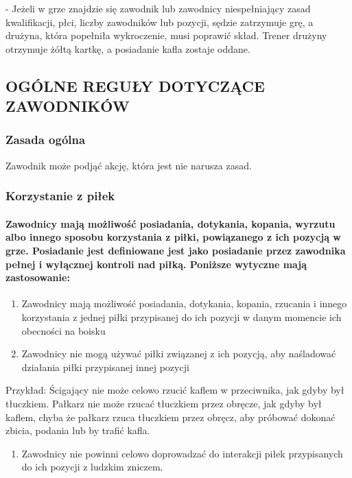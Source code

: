 \documentclass[12pt]{article}
\newcommand\other{\bgroup\color{green}\markoverwith{\textcolor{green}{\rule[-0.5ex]{2pt}{0.4pt}}}\ULon}
\begin{document}
\other{Kara specjalna} - Jeżeli w grze znajdzie się zawodnik lub
zawodnicy niespełniający zasad kwalifikacji, płci, liczby zawodników lub
pozycji, sędzie zatrzymuje grę, a drużyna, która popełniła wykroczenie,
musi poprawić skład. Trener drużyny otrzymuje żółtą kartkę, a posiadanie
kafla zostaje oddane.

\subsection{OGÓLNE REGUŁY DOTYCZĄCE ZAWODNIKÓW}

\subsubsection{Zasada ogólna}

Zawodnik może podjąć akcję, która jest nie narusza zasad.

\subsubsection{Korzystanie z piłek}

\paragraph{Zawodnicy mają możliwość posiadania, dotykania,
	kopania, wyrzutu albo innego sposobu korzystania z piłki, powiązanego z
	ich pozycją w grze. Posiadanie jest definiowane jest jako posiadanie
	przez zawodnika pełnej i wyłącznej kontroli nad piłką. Poniższe wytyczne
	mają zastosowanie:}

\begin{enumerate}
	\item
	      Zawodnicy mają możliwość posiadania, dotykania, kopania, rzucania i
	      innego korzystania z jednej piłki przypisanej do ich pozycji w danym
	      momencie ich obecności na boisku
	\item
	      Zawodnicy nie mogą używać piłki związanej z ich pozycją, aby
	      naśladować działania piłki przypisanej innej pozycji
\end{enumerate}

Przykład: Ścigający nie może celowo rzucić kaflem w
przeciwnika, jak gdyby był tłuczkiem. Pałkarz nie może rzucać tłuczkiem
przez obręcze, jak gdyby był kaflem, chyba że pałkarz rzuca tłuczkiem
przez obręcz, aby próbować dokonać zbicia, podania lub by trafić kafla.

\begin{enumerate}[resume]
	\item Zawodnicy nie powinni celowo doprowadzać do interakcji piłek
	      przypisanych do ich pozycji z ludzkim zniczem.
\end{enumerate}
\end{document}
